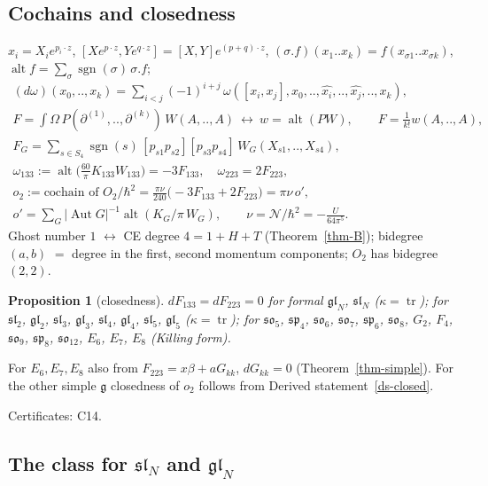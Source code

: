 \documentclass[10pt,a4paper]{article}
\numberwithin{equation}{section}
\newtheorem{proposition}[theorem]{Proposition}
\theoremstyle{definition}
\theoremstyle{remark}
\newcommand{\tr}{\operatorname{tr}}
\newcommand{\alt}{\operatorname{alt}}
\newcommand{\sgn}{\operatorname{sgn}}
\newcommand{\g}{\mathfrak g}
\newcommand{\fsl}{\mathfrak{sl}}
\newcommand{\fgl}{\mathfrak{gl}}
\newcommand{\fso}{\mathfrak{so}}
\newcommand{\fsp}{\mathfrak{sp}}
\newcommand{\cN}{\mathcal N}
\newcommand{\Aut}{\operatorname{Aut}}
\newcommand{\cert}[1]{\par\noindent\textup{Certificates: #1.}\par}
\begin{document}
\subsection{Cochains and closedness}\label{sec-cochains}

$x_i=X_ie^{p_i\cdot z}$, $[Xe^{p\cdot z},Ye^{q\cdot z}]=[X,Y]e^{(p+q)\cdot z}$, $(\sigma.f)(x_1..x_k)=f(x_{\sigma1}..x_{\sigma k})$, $\alt f=\sum_\sigma\sgn(\sigma)\,\sigma.f$;
\begin{gather}
(d\omega)(x_0,..,x_k)=\sum_{i<j}(-1)^{i+j}\,\omega([x_i,x_j],x_0,..,\widehat{x_i},..,\widehat{x_j},..,x_k),\\
F=\int\Omega\,P(\partial^{(1)},..,\partial^{(k)})\,W(A,..,A)\ \longleftrightarrow\ w=\alt(PW),\qquad F=\tfrac1{k!}w(A,..,A),\label{eq-dict}\\
F_G=\sum_{s\in S_4}\sgn(s)\,[p_{s1}p_{s2}][p_{s3}p_{s4}]\,W_G(X_{s1},..,X_{s4}),\\ \omega_{133}:=\alt\big(\tfrac{60}\pi K_{133}W_{133}\big)=-3F_{133},\quad \omega_{223}=2F_{223},\\
o_2:=\text{cochain of }O_2/\hbar^2=\frac{\pi\nu}{240}\big(-3F_{133}+2F_{223}\big)=\pi\nu\,o',\\ o'=\sum_G|\Aut G|^{-1}\alt(K_G/\pi\,W_G),\qquad \nu=\cN/\hbar^2=-\frac{U}{64\pi^5}.
\end{gather}
Ghost number $1$ $\leftrightarrow$ CE degree $4=1+H+T$ (Theorem~\ref{thm-B}); bidegree $(a,b)$ $=$ degree in the first, second momentum components; $O_2$ has bidegree $(2,2)$.

\begin{proposition}[closedness]\label{prop-closed}
$dF_{133}=dF_{223}=0$ for formal $\fgl_N$, $\fsl_N$ ($\kappa=\tr$); for $\fsl_2$, $\fgl_2$, $\fsl_3$, $\fgl_3$, $\fsl_4$, $\fgl_4$, $\fsl_5$, $\fgl_5$ ($\kappa=\tr$); for $\fso_5$, $\fsp_4$, $\fso_6$, $\fso_7$, $\fsp_6$, $\fso_8$, $G_2$, $F_4$, $\fso_9$, $\fsp_8$, $\fso_{12}$, $E_6$, $E_7$, $E_8$ (Killing form).
\end{proposition}
For $E_6,E_7,E_8$ also from $F_{223}=x\beta+aG_{kk}$, $dG_{kk}=0$ (Theorem~\ref{thm-simple}). For the other simple $\g$ closedness of $o_2$ follows from Derived statement~\ref{ds-closed}.
\cert{C14}

\subsection{\texorpdfstring{The class for $\fsl_N$ and $\fgl_N$}{The class for sl(N) and gl(N)}}\label{sec-class-slN}
\end{document}
